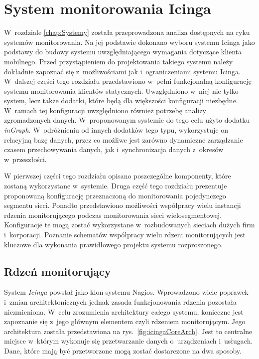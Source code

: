 \chapter{System monitorowania Icinga}
\label{chap:Icinga}

W~rozdziale \ref{chap:Systemy} została przeprowadzona analiza
dostępnych na ryku systemów monitorowania. Na jej podstawie dokonano
wyboru systemu Icinga jako podstawy do budowy systemu uwzględniającego
wymagania dotyczące klienta mobilnego. Przed przystąpieniem do
projektowania takiego systemu należy dokładnie zapoznać się
z~możliwościami jak i~ograniczeniami systemu Icinga. W~dalszej części
tego rozdziału przedstawiono w~pełni funkcjonalną konfigurację systemu
monitorowania klientów statycznych. Uwzględniono w~niej nie tylko
system, lecz także dodatki, które będą dla większości konfiguracji
niezbędne. W~ramach tej konfiguracji uwzględniono również potrzebę
analizy zgromadzonych danych. W~proponowanym systemie do tego celu
użyto dodatku {\em inGraph}. W~odróżnieniu od innych dodatków tego typu,
wykorzystuje on relacyjną bazę danych, przez co możliwe jest zarówno
dynamiczne zarządzanie czasem przechowywania danych, jak
i~synchronizacja danych z~okresów w~przeszłości.

W pierwszej części tego rozdziału opisano poszczególne komponenty,
które zostaną wykorzystane w~systemie. Druga część tego rozdziału
prezentuje proponowaną konfigurację przeznaczoną do monitorowania
pojedynczego segmentu sieci. Ponadto przedstawiono możliwości
współpracy wielu instancji rdzenia monitorującego podczas
monitorowania sieci wielosegmentowej. Konfiguracje te mogą zostać
wykorzystane w~rozbudowanych sieciach dużych firm
i~korporacji. Poznanie schematów współpracy wielu rdzeni
monitorujących jest kluczowe dla wykonania prawidłowego projektu
systemu rozproszonego.

\section[Rdzeń monitorujący][Rdzeń monitorujący]{Rdzeń monitorujący}
\label{sec:IcingaCore}

System {\em Icinga} powstał jako klon systemu Nagios. Wprowadzono wiele
poprawek i~zmian architektonicznych jednak zasada funkcjonowania
rdzenia pozostała niezmieniona. W~celu zrozumienia architektury całego
systemu, konieczne jest zapoznanie się z~jego głównym elementem czyli
rdzeniem monitorującym. Jego architektura została przedstawiona na
rys.~\ref{fig:icingaCoreArch}. Jest to centralne miejsce w~którym
wykonuje się przetwarzanie danych o~urządzeniach i~usługach. Dane,
które mają być przetworzone mogą zostać dostarczone na dwa sposoby.

